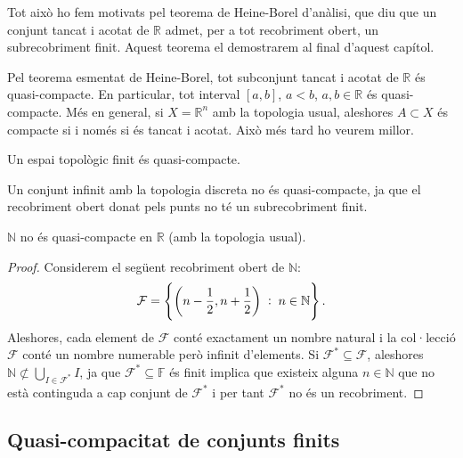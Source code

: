 \documentclass[../main.tex]{subfiles}
\begin{document}
Tot això ho fem motivats pel teorema de Heine-Borel d'anàlisi, que diu que un conjunt tancat i acotat de $\mathbb{R}$ admet, per a tot recobriment obert, un subrecobriment finit. Aquest teorema el demostrarem al final d'aquest capítol.

\begin{ej}
\label{ej:qc1} Pel teorema esmentat de Heine-Borel, tot subconjunt tancat i acotat de $\mathbb{R}$ és quasi-compacte. En particular, tot interval $[a,b]$, $a<b$, $a,b\in\mathbb{R}$ és quasi-compacte. Més en general, si $X = \mathbb{R}^n$ amb la topologia usual, aleshores $A\subset X$ és compacte si i només si és tancat i acotat. Això més tard ho veurem millor.
\end{ej}

\begin{ej}
\label{ej:qc2} Un espai topològic finit és quasi-compacte.
\end{ej}

\begin{ej}
\label{ej:qc3} Un conjunt infinit amb la topologia discreta no és quasi-compacte, ja que el recobriment obert donat pels punts no té un subrecobriment finit.
\end{ej}

\begin{coro}
[Exemple]\label{ej:qc4} $\mathbb{N}$ no és quasi-compacte en $\mathbb{R}$ (amb la topologia usual).
\end{coro}
\begin{proof}
Considerem el següent recobriment obert de $\mathbb{N}$:
\begin{equation}
    \notag
    \mathcal{F}=\left\{\left(n-\frac{1}{2},n+\frac{1}{2}\right)\;:\;n\in\mathbb{N}\right\} .
\end{equation}
Aleshores, cada element de $\mathcal{F}$ conté exactament un nombre natural i la col·lecció $\mathcal{F}$ conté un nombre numerable però infinit d'elements. Si $\mathcal{F}^*\subseteq\mathcal{F}$, aleshores $\mathbb{N}\not\subset \bigcup_{I\in\mathcal{F}^*} I$, ja que $\mathcal{F}^*\subseteq \mathbb{F}$ és finit implica que existeix alguna $n\in\mathbb{N}$ que no està continguda a cap conjunt de $\mathcal{F}^*$ i per tant $\mathcal{F}^*$ no és un recobriment.
\end{proof}

\subsection{Quasi-compacitat de conjunts finits}
\end{document}
